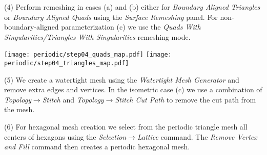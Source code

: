 \documentclass[Thesis.tex]{subfiles}
\begin{document}
\begin{compactenum}[(1)]
\begin{center}
\begin{minipage}{0.9\linewidth}
            \centering
\end{minipage}
\end{center}    

\item[(4)] Perform remeshing in cases (a) and (b) either for \emph{Boundary Aligned Triangles} or \emph{Boundary Aligned Quads} using the \emph{Surface Remeshing} panel. For non-boundary-aligned parameterization (c) we use the \emph{Quads With Singularities/Triangles With Singularities} remeshing mode.\\

\begin{center}
\begin{minipage}{0.9\linewidth}
            \centering
            \texttt{[image: periodic/step04\_quads\_map.pdf]}
            \texttt{[image: periodic/step04\_triangles\_map.pdf]}
\end{minipage}
\end{center}    

\item[(5)] We create a watertight mesh using the \emph{Watertight Mesh Generator} and remove extra edges and vertices. In the isometric case (c) we use a combination of \emph{Topology$\to$Stitch} and \emph{Topology$\to$Stitch Cut Path} to remove the cut path from the mesh.
\item[(6)] For hexagonal mesh creation we select from the periodic triangle mesh all centers of hexagons using the \emph{Selection$\to$Lattice} command. The \emph{Remove Vertex and Fill} command then creates a periodic hexagonal mesh.
\begin{center}
\begin{minipage}{0.9\linewidth}
            \centering
\end{minipage}
\end{center}                
\end{compactenum}
\end{document}
